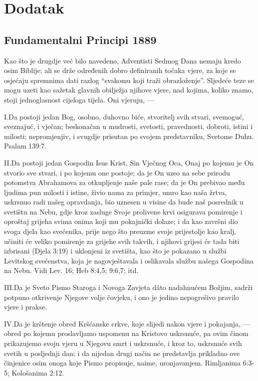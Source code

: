 \chapter*{Dodatak} \label{chap:appendix}

\section*{Fundamentalni Principi 1889}

Kao što je drugdje već bilo navedeno, Adventisti Sedmog Dana nemaju kredo osim Biblije; ali se drže određenih dobro definiranih točaka vjere, za koje se osjećaju spremnima dati razlog “svakomu koji traži obrazloženje”. Sljedeće teze se mogu uzeti kao sažetak glavnih obilježja njihove vjere, nad kojima, koliko znamo, stoji jednoglasnost cijeloga tijela. Oni vjeruju, —

\lettrine{I.} Da postoji jedan Bog, osobno, duhovno biće, stvoritelj svih stvari, svemoguć, sveznajuć, i vječan; beskonačan u mudrosti, svetosti, pravednosti, dobroti, istini i milosti; nepromjenjiv, i svugdje prisutan po svojem predstavniku, Svetome Duhu. Psalam 139:7.

\lettrine{II.} Da postoji jedan Gospodin Isus Krist, Sin Vječnog Oca, Onaj po kojemu je On stvorio sve stvari, i po kojemu one postoje; da je On uzeo na sebe prirodu potomstva Abrahamova za otkupljenje naše pale rase; da je On prebivao među ljudima pun milosti i istine, živio nama za primjer, umro kao naša žrtva, uskrsnuo radi našeg opravdanja, bio uznesen u visine da bude naš posrednik u svetištu na Nebu, gdje kroz zasluge Svoje prolivene krvi osigurava pomirenje i oproštaj grijeha svima onima koji mu pokajnički dolaze; i da kao završni dio svoga djela kao svećenika, prije nego što preuzme svoje prijestolje kao kralj, učiniti će veliko pomirenje za grijehe svih takvih, i njihovi grijesi će tada biti izbrisani (Djela 3:19) i uklonjeni iz svetišta, kao što je pokazano u službi Levitskog svećenstva, koja je nagovještavala i oslikavala službu našega Gospodina na Nebu. Vidi Lev. 16; Heb 8:4,5; 9:6,7; itd.

\lettrine{III.} Da je Sveto Pismo Staroga i Novoga Zavjeta dâto nadahnućem Božjim, sadrži potpuno otkrivenje Njegove volje čovjeku, i ono je jedino nepogrešivo pravilo vjere i prakse.

\lettrine{IV.} Da je krštenje obred Kršćanske crkve, koje slijedi nakon vjere i pokajanja, — obred po kojemu proslavljamo uspomenu na Kristovo uskrsnuće, pa ovim činom prikazujemo svoju vjeru u Njegovu smrt i uskrsnuće, i kroz to, uskrsnuće svih svetih u posljednji dan; i da nijedan drugi način ne predstavlja prikladno ove činjenice osim onoga koje Pismo propisuje, naime, uronjavanjem. Rimljanima 6:3-5; Kološanima 2:12.

